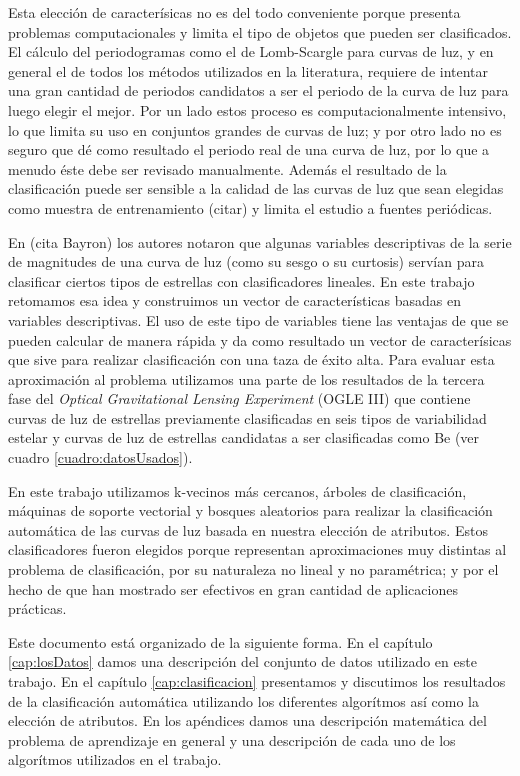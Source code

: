 \documentclass[letterpaper,12pt]{book}
\begin{document}
Esta elección de caracterísicas no es del todo conveniente porque presenta problemas computacionales y limita el tipo de objetos que pueden ser clasificados. El cálculo del periodogramas como el de Lomb-Scargle para curvas de luz, y en general el de todos los métodos utilizados en la literatura, requiere de intentar una gran cantidad de periodos candidatos a ser el periodo de la curva de luz para luego elegir el mejor. Por un lado estos proceso es computacionalmente intensivo, lo que limita su uso en conjuntos grandes de curvas de luz; y por otro lado no es seguro que dé como resultado el periodo real de una curva de luz, por lo que a menudo éste debe ser revisado manualmente. Además el resultado de la clasificación puede ser sensible a la calidad de las curvas de luz que sean elegidas como muestra de entrenamiento (citar) y limita el estudio a fuentes periódicas.  

En (cita Bayron) los autores notaron que algunas variables descriptivas de la serie de magnitudes de una curva de luz (como su sesgo o su curtosis) servían para clasificar ciertos tipos de estrellas con clasificadores lineales. En este trabajo retomamos esa idea y construimos un vector de características basadas en variables descriptivas. El uso de este tipo de variables tiene las ventajas de que se pueden calcular de manera rápida y da como resultado un vector de caracterísicas que sive para realizar clasificación con una taza de éxito alta. Para evaluar esta aproximación al problema utilizamos una parte de los resultados de la tercera fase del \textit{Optical Gravitational Lensing Experiment} (OGLE III) que contiene curvas de luz  de estrellas previamente clasificadas en seis tipos de variabilidad estelar y curvas de luz de estrellas candidatas a ser clasificadas como Be (ver cuadro \ref{cuadro:datosUsados}).


En este trabajo utilizamos k-vecinos más cercanos, árboles de clasificación, máquinas de soporte vectorial y bosques aleatorios para realizar la clasificación automática de las curvas de luz basada en nuestra elección de atributos. Estos clasificadores fueron elegidos porque representan aproximaciones muy distintas al problema de clasificación, por su naturaleza no lineal y no paramétrica; y por el hecho de que han mostrado ser efectivos en gran cantidad de aplicaciones prácticas. 

Este documento está organizado de la siguiente forma. En el capítulo \ref{cap:losDatos} damos una descripción del conjunto de datos utilizado en este trabajo. En el capítulo \ref{cap:clasificacion} presentamos y discutimos los resultados de la clasificación automática utilizando los diferentes algorítmos así como la elección de atributos. En los apéndices damos una descripción matemática del problema de aprendizaje en general y una descripción de cada uno de los algorítmos utilizados en el trabajo.
\end{document}
